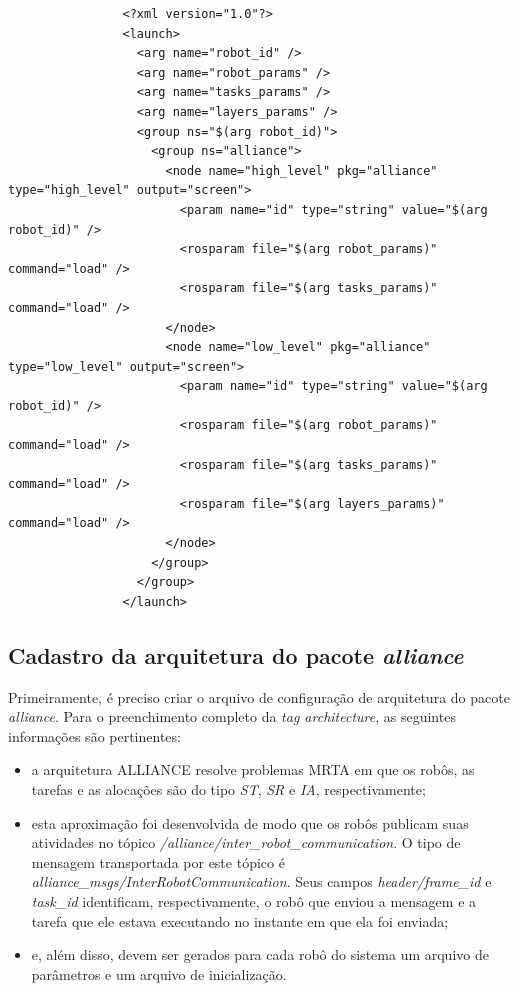             \begin{lstlisting}
                <?xml version="1.0"?>
                <launch>
                  <arg name="robot_id" />
                  <arg name="robot_params" />
                  <arg name="tasks_params" />
                  <arg name="layers_params" />
                  <group ns="$(arg robot_id)">
                    <group ns="alliance">
                      <node name="high_level" pkg="alliance" type="high_level" output="screen">
                        <param name="id" type="string" value="$(arg robot_id)" />
                        <rosparam file="$(arg robot_params)" command="load" />
                        <rosparam file="$(arg tasks_params)" command="load" />
                      </node>
                      <node name="low_level" pkg="alliance" type="low_level" output="screen">
                        <param name="id" type="string" value="$(arg robot_id)" />
                        <rosparam file="$(arg robot_params)" command="load" />
                        <rosparam file="$(arg tasks_params)" command="load" />
                        <rosparam file="$(arg layers_params)" command="load" />
                      </node>
                    </group>
                  </group>
                </launch>
            \end{lstlisting}
            
        \subsection{Cadastro da arquitetura do pacote \textit{alliance}}
            Primeiramente, é preciso criar o arquivo de configuração de arquitetura do pacote \textit{alliance}. Para o preenchimento completo da \textit{tag architecture}, as seguintes informações são pertinentes:
            
            \begin{itemize}
                \item a arquitetura ALLIANCE resolve problemas MRTA em que os robôs, as tarefas e as alocações são do tipo \textit{ST}, \textit{SR} e \textit{IA}, respectivamente;
                
                \item esta aproximação foi desenvolvida de modo que os robôs publicam suas atividades no tópico \textit{/alliance/inter\_robot\_communication}. O tipo de mensagem transportada por este tópico é \textit{alliance\_msgs/InterRobotCommunication}. Seus campos \textit{header/frame\_id} e \textit{task\_id} identificam, respectivamente, o robô que enviou a mensagem e a tarefa que ele estava executando no instante em que ela foi enviada;
                
                \item e, além disso, devem ser gerados para cada robô do sistema um arquivo de parâmetros e um arquivo de inicialização.
            \end{itemize}
            
